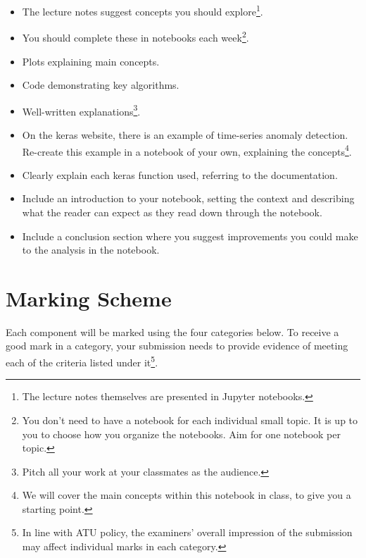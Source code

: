 \documentclass[a4paper]{tufte-handout}
\begin{document}
\begin{itemize}
  \item The lecture notes suggest concepts you should explore\footnote{The lecture notes themselves are presented in Jupyter notebooks.}.
  \item You should complete these in notebooks each week\footnote{You don't need to have a notebook for each individual small topic. It is up to you to choose how you organize the notebooks. Aim for one notebook per topic.}.
  \item Plots explaining main concepts.
  \item Code demonstrating key algorithms.
  \item Well-written explanations\footnote{Pitch all your work at your classmates as the audience.}.
\end{itemize} 

\begin{itemize}
  \item On the keras\cite{keraswebsite} website, there is an example of time-series anomaly detection\cite{timeseriesanomaly}. Re-create this example in a notebook of your own, explaining the concepts\footnote{We will cover the main concepts within this notebook in class, to give you a starting point.}.
  \item Clearly explain each keras function used, referring to the documentation.
  \item Include an introduction to your notebook, setting the context and describing what the reader can expect as they read down through the notebook.
  \item Include a conclusion section where you suggest improvements you could make to the analysis in the notebook.
\end{itemize}


\section{Marking Scheme}
Each component will be marked using the four categories below.
To receive a good mark in a category, your submission needs to provide evidence of meeting each of the criteria listed under it\footnote{In line with ATU policy, the examiners' overall impression of the submission may affect individual marks in each category.}.
\end{document}
